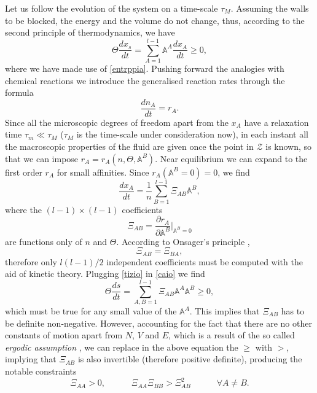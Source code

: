 \documentclass[useAMS,usenatbib,prd,twocolumn,nofootinbib]{revtex4-1}
\newcommand{\spc}{\quad \quad \quad}
\begin{document}
Let us follow the evolution of the system on a time-scale $\tau_M$. Assuming the walls to be blocked, the energy and the volume do not change, thus, according to the second principle of thermodynamics, we have
\begin{equation}\label{caio}
\Theta \dfrac{d x_s}{dt} = \sum_{A=1}^{l-1} \mathbb{A}^A \dfrac{dx_A}{dt} \geq 0 ,
\end{equation} 
where we have made use of \eqref{entrppia}. Pushing forward the analogies with chemical reactions we introduce the generalised reaction rates through the formula
\begin{equation}
\dfrac{dn_A}{dt} = r_A .
\end{equation}
Since all the microscopic degrees of freedom apart from the $x_A$ have a relaxation time $\tau_m \ll \tau_M$ ($\tau_M$ is the time-scale under consideration now), in each instant all the macroscopic properties of the fluid are given once the point in $\mathcal{Z}$ is known, so that we can impose $r_A=r_A(n,\Theta,\mathbb{A}^B)$. Near equilibrium we can expand to the first order $r_A$ for small affinities. Since $r_A(\mathbb{A}^B =0)=0$, we find
\begin{equation}\label{tizio}
\dfrac{dx_A}{dt} = \dfrac{1}{n} \sum_{B=1}^{l-1} \Xi_{AB} \mathbb{A}^B,
\end{equation}
where the $(l-1)\times (l-1)$ coefficients 
\begin{equation}
\Xi_{AB} = \dfrac{\partial r_A}{\partial \mathbb{A}^B} \bigg|_{\mathbb{A}^B=0}
\end{equation}
 are functions only of $n$ and $\Theta$.
 According to Onsager's principle \citep{Onsager_1931,Onsager_Casimir},
\begin{equation}
\Xi_{AB} = \Xi_{BA},
\end{equation}
therefore only
$
{l(l-1)}/{2}
$
independent coefficients must be computed with the aid of kinetic theory. 
Plugging \eqref{tizio} in \eqref{caio} we find
\begin{equation}\label{ragazzi}
\Theta \dfrac{d s}{dt} = \sum_{A,B=1}^{l-1} \Xi_{AB} \mathbb{A}^A \mathbb{A}^B  \geq 0,
\end{equation}
which must be true for any small value of the $\mathbb{A}^A$. This implies that $\Xi_{AB}$ has to be definite non-negative. However, accounting for the fact that there are no other constants of motion apart from $N$, $V$ and $E$, which is a result of the so called \textit{ergodic assumption} \citep{Parisi_book_1988}, we can replace in the above equation the $\geq$ with $>$, implying that $\Xi_{AB}$ is also invertible (therefore positive definite), producing the notable constraints
\begin{equation}
\Xi_{AA} > 0 , \spc \Xi_{AA}\Xi_{BB} > \Xi_{AB}^2 \spc  \forall A \neq B.
\end{equation}
\end{document}
